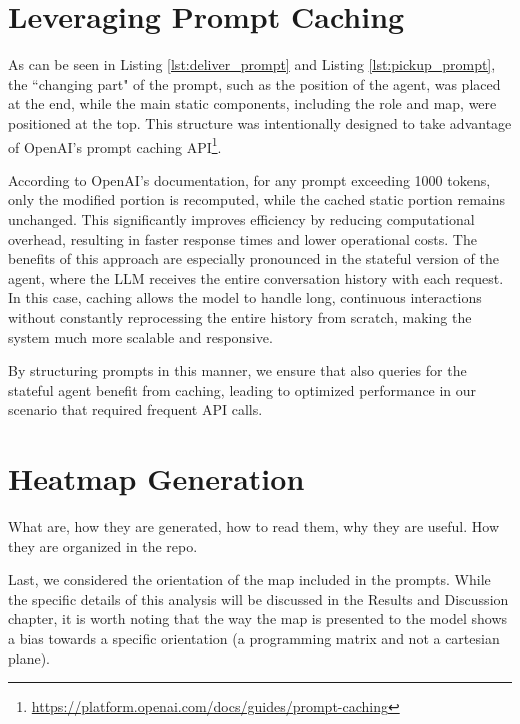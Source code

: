 \section{Leveraging Prompt Caching}
As can be seen in Listing \ref{lst:deliver_prompt} and Listing \ref{lst:pickup_prompt},
the ``changing part" of the prompt, such as the position of the agent, was placed
at the end, while the main static components, including the role and map, were
positioned at the top. This structure was intentionally designed to take advantage
of OpenAI's prompt caching API\footnote{\url{https://platform.openai.com/docs/guides/prompt-caching}}.

According to OpenAI's documentation, for any prompt exceeding 1000 tokens, only
the modified portion is recomputed, while the cached static portion remains unchanged.
This significantly improves efficiency by reducing computational overhead, resulting
in faster response times and lower operational costs. The benefits of this
approach are especially pronounced in the stateful version of the agent, where the
LLM receives the entire conversation history with each request. In this case, caching
allows the model to handle long, continuous interactions without constantly
reprocessing the entire history from scratch, making the system much more scalable
and responsive.

By structuring prompts in this manner, we ensure that also queries for the
stateful agent benefit from caching, leading to optimized performance in our scenario
that required frequent API calls.

\section{Heatmap Generation}
\label{sec:heatmap_generation}

What are, how they are generated, how to read them, why they are useful. How
they are organized in the repo.

Last, we considered the orientation of the map included in the prompts. While
the specific details of this analysis will be discussed in the Results and
Discussion chapter, it is worth noting that the way the map is presented to the model
shows a bias towards a specific orientation (a programming matrix and not a
cartesian plane).